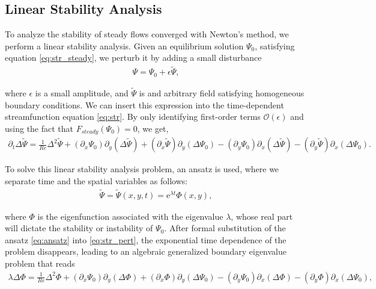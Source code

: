 \subsection{Linear Stability Analysis}

To analyze the stability of steady flows converged with Newton's method, we
perform a linear stability analysis. Given an equilibrium solution $\Psi_0$,
satisfying equation \eqref{eq:str_steady}, we perturb it by adding a small
disturbance
\begin{align}
\Psi = \Psi_0 + \epsilon \tilde{\Psi},
\end{align}

where $\epsilon$ is a small amplitude, and $\tilde{\Psi}$ is and arbitrary
field satisfying homogeneous boundary conditions. We can insert this expression
into the time-dependent streamfunction equation \eqref{eq:str}. By only
identifying first-order terms $\mathcal{O}(\epsilon)$ and using the fact that
$F_{steady}(\Psi_0) = 0$, we get,
\begin{align}
\partial_t \Delta \tilde{\Psi} = \frac{1}{Re} \Delta^2 \tilde{\Psi}
  + (\partial_x \Psi_0) \partial_y (\Delta \tilde{\Psi})
  + (\partial_x \tilde{\Psi}) \partial_y (\Delta \Psi_0)
  - (\partial_y \Psi_0) \partial_x (\Delta \tilde{\Psi})
  - (\partial_y \tilde{\Psi}) \partial_x (\Delta \Psi_0).
\label{eq:str_pert}
\end{align}

To solve this linear stability analysis problem, an ansatz is used, where we
separate time and the spatial variables as follows: 
\begin{align}
  \tilde{\Psi} = \tilde{\Psi}(x,y,t) = \mathrm{e}^{\lambda t} \Phi(x,y),
  \label{eq:ansatz}
\end{align}

where $\Phi$ is the eigenfunction associated with the eigenvalue $\lambda$,
whose real part will dictate the stability or instability of $\Psi_0$. After
formal substitution of the ansatz \eqref{eq:ansatz} into \eqref{eq:str_pert},
the exponential time dependence of the problem disappears, leading to an
algebraic generalized boundary eigenvalue problem that reads
\begin{align}
\lambda \Delta \Phi = \frac{1}{Re} \Delta^2 \Phi
  + (\partial_x \Psi_0) \partial_y (\Delta \Phi)
  + (\partial_x \Phi) \partial_y (\Delta \Psi_0)
  - (\partial_y \Psi_0) \partial_x (\Delta \Phi)
  - (\partial_y \Phi) \partial_x (\Delta \Psi_0),
\label{eq:str_phi}
\end{align}

